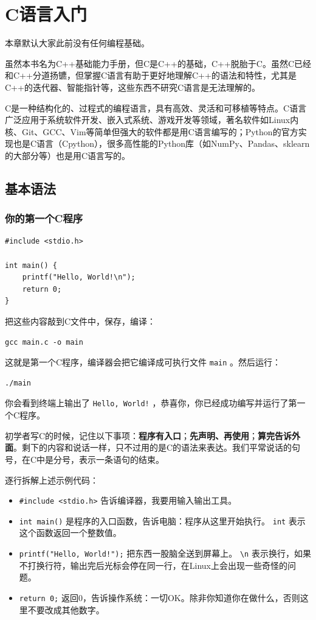 \chapter{C语言入门}

本章默认大家此前没有任何编程基础。

虽然本书名为C++基础能力手册，但C是C++的基础，C++脱胎于C。虽然C已经和C++分道扬镳，但掌握C语言有助于更好地理解C++的语法和特性，尤其是C++的迭代器、智能指针等，这些东西不研究C语言是无法理解的。

C是一种结构化的、过程式的编程语言，具有高效、灵活和可移植等特点。C语言广泛应用于系统软件开发、嵌入式系统、游戏开发等领域，著名软件如Linux内核、Git、GCC、Vim等简单但强大的软件都是用C语言编写的；Python的官方实现也是C语言（Cpython），很多高性能的Python库（如NumPy、Pandas、sklearn的大部分等）也是用C语言写的。

\section{基本语法}

\subsection{你的第一个C程序}

\begin{verbatim}
#include <stdio.h>

int main() {
    printf("Hello, World!\n");
    return 0;
}
\end{verbatim}
把这些内容敲到C文件中，保存，编译：
\begin{verbatim}
gcc main.c -o main
\end{verbatim}
这就是第一个C程序，编译器会把它编译成可执行文件 \verb|main| 。然后运行：
\begin{verbatim}
./main
\end{verbatim}
你会看到终端上输出了 \verb|Hello, World!| ，恭喜你，你已经成功编写并运行了第一个C程序。

初学者写C的时候，记住以下事项：\textbf{程序有入口}；\textbf{先声明、再使用}；\textbf{算完告诉外面}。剩下的内容和说话一样，只不过用的是C的语法来表达。我们平常说话的句号，在C中是分号，表示一条语句的结束。

逐行拆解上述示例代码：
\begin{itemize}
  \item  \texttt{#include <stdio.h>} 告诉编译器，我要用输入输出工具。
  \item  \texttt{int main()} 是程序的入口函数，告诉电脑：程序从这里开始执行。 \texttt{int} 表示这个函数返回一个整数值。
  \item  \texttt{printf("Hello, World!\n");} 把东西一股脑全送到屏幕上。 \verb|\n| 表示换行，如果不打换行符，输出完后光标会停在同一行，在Linux上会出现一些奇怪的问题。
  \item  \texttt{return 0;} 返回0，告诉操作系统：一切OK。除非你知道你在做什么，否则这里不要改成其他数字。
\end{itemize}

